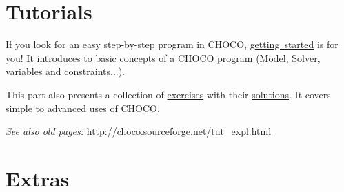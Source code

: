\part{Tutorials}\label{ch:tut}\hypertarget{ch:tut}{}
If you look for an easy step-by-step program in CHOCO, \hyperlink{gettingstarted}{getting\ started} is for you! It introduces to basic concepts of a CHOCO program (Model, Solver, variables and constraints...).

This part also presents a collection of \hyperlink{exercises}{exercises} with their \hyperlink{solutions}{solutions}. It covers simple to advanced uses of CHOCO.

\emph{See also old pages:} \url{http://choco.sourceforge.net/tut\_expl.html}





\part{Extras}\label{ch:extra}\hypertarget{ch:extra}{}


